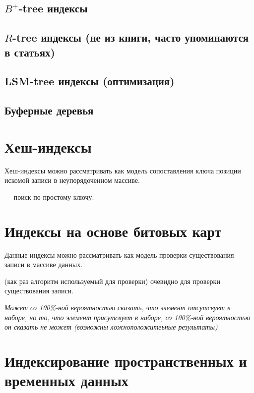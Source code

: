 \subsection{$B^+$-tree индексы}

\subsection{$R$-tree индексы (не из книги, часто упоминаются в статьях)}

\subsection{LSM-tree индексы (оптимизация)}

\subsection{Буферные деревья}


\section{Хеш-индексы}

Хеш-индексы можно рассматривать как модель сопоставления ключа позиции
искомой записи в неупорядоченном массиве.

 --- поиск по простому ключу.

\section{Индексы на основе битовых карт}

Данные индексы можно рассматривать как модель проверки существования записи в
массиве данных.

 (как раз алгоритм используемый для проверки) очевидно
 для проверки существования записи.

\textit{Может со 100\%-ной вероятностью сказать, что элемент отсутсвует в
наборе, но то, что элемент присутсвует в наборе, со 100\%-ной вероятностью он
сказать не может (возможны ложноположитеьные результаты)}

\section{Индексирование пространственных и временных данных}
